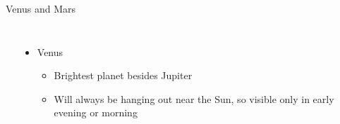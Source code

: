 \documentclass[pdf, aspectratio=169]{beamer}
\begin{document}
\begin{frame}{Venus and Mars}
	\begin{columns}
		\begin{center}
		\end{center}
		\begin{itemize}
			\item<1-> Venus
				\begin{itemize}
					\item Brightest planet besides Jupiter
					\item Will always be hanging out near the Sun, so visible only in early evening or morning

\end{itemize}
\end{itemize}
\end{columns}
\end{frame}
\end{document}
